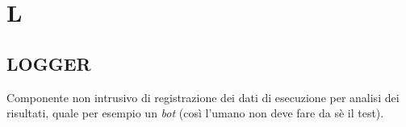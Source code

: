 \newpage
	\flushright{\hyperref[index]{\color{black!65}{Ritorna all'indice}}}\flushleft
	\section{L} \label{sec:L}
	
		\subsection{LOGGER}		\label{logger}
		Componente non intrusivo di registrazione dei dati di esecuzione per analisi dei risultati, quale per esempio un \textit{bot} (così l'umano non deve fare da sè il test).
	
	
